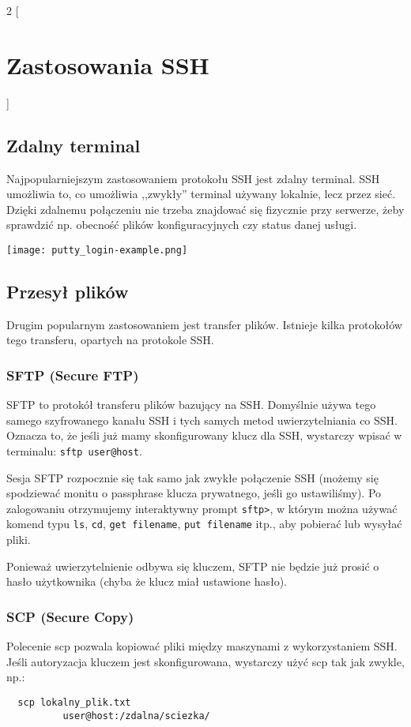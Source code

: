 \documentclass{article}
\begin{document}
\begin{multicols}{2}
[
\section{Zastosowania SSH}
]
\subsection{Zdalny terminal}
Najpopularniejszym zastosowaniem protokołu SSH jest zdalny terminal. SSH umożliwia to, co umożliwia ,,zwykły'' terminal używany lokalnie, lecz przez sieć. Dzięki zdalnemu połączeniu nie trzeba znajdować się fizycznie przy serwerze, żeby sprawdzić np. obecność plików konfiguracyjnych czy status danej usługi.

\noindent
\texttt{[image: putty\_login-example.png]}

\subsection{Przesył plików}
Drugim popularnym zastosowaniem jest transfer plików. Istnieje kilka protokołów tego transferu, opartych na protokole SSH.

\subsubsection{SFTP (Secure FTP)}
SFTP to protokół transferu plików bazujący na SSH. Domyślnie używa tego samego szyfrowanego kanału SSH i tych samych metod uwierzytelniania co SSH. Oznacza to, że jeśli już mamy skonfigurowany klucz dla SSH, wystarczy wpisać w terminalu: \verb|sftp user@host|.

Sesja SFTP rozpocznie się tak samo jak zwykłe połączenie SSH (możemy się spodziewać monitu o passphrase klucza prywatnego, jeśli go ustawiliśmy). Po zalogowaniu otrzymujemy interaktywny prompt \verb|sftp>|, w którym można używać komend typu \verb|ls|, \verb|cd|, \verb|get filename|, \verb|put filename| itp., aby pobierać lub wysyłać pliki\cite{digitalsftp}. 

Ponieważ uwierzytelnienie odbywa się kluczem, SFTP nie będzie już prosić o hasło użytkownika (chyba że klucz miał ustawione hasło).

\subsubsection{SCP (Secure Copy)}
Polecenie scp pozwala kopiować pliki między maszynami z wykorzystaniem SSH. Jeśli autoryzacja kluczem jest skonfigurowana, wystarczy użyć scp tak jak zwykle, np.: 
\begin{verbatim}
  scp lokalny_plik.txt
          user@host:/zdalna/sciezka/
\end{verbatim}


\end{multicols}
\end{document}
